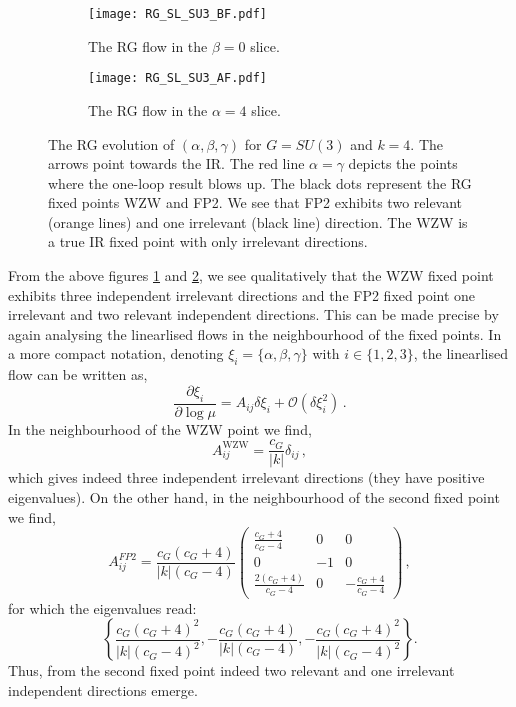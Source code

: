 \documentclass[12pt]{article}
\begin{document}
\begin{figure}[H]
	\centering
	\begin{subfigure}[t]{0.49\textwidth}
		\centering
		\texttt{[image: RG\_SL\_SU3\_BF.pdf]}
		\caption{ The RG flow in the $\beta=0$ slice. }\label{fig:RGslBF}		
	\end{subfigure}
	\begin{subfigure}[t]{0.49\textwidth}
		\centering
		\texttt{[image: RG\_SL\_SU3\_AF.pdf]}
		\caption{The RG flow in the $\alpha=4$ slice.}\label{fig:RGslAF}
	\end{subfigure}
	\caption{The RG evolution of $(\alpha,\beta,\gamma)$ for $G=SU(3)$ and $k=4$. The arrows point towards the IR. The red line $\alpha = \gamma$ depicts the points where the one-loop result blows up. The black dots represent the RG fixed points WZW and FP2. We see that FP2 exhibits two relevant (orange lines) and one irrelevant (black line) direction. The WZW is a true IR fixed point with only irrelevant directions. }\label{fig:RGsl}
\end{figure}



From the above figures \ref{fig:RGslBF} and \ref{fig:RGslAF}, we see qualitatively that the WZW fixed point exhibits three independent irrelevant directions and the FP2 fixed point one irrelevant and two relevant independent directions. This can be made precise by again analysing the linearlised flows in the neighbourhood of the fixed points. In a more compact notation, denoting $\xi_i = \{\alpha,\beta,\gamma\}$ with $i\in \{1,2,3\}$, the linearlised flow can be written as,
\begin{equation}
\frac{\partial \xi_{i}}{\partial\log\mu} = A_{ij}\delta\xi_{i} + \mathcal{O} (\delta\xi_{i}^{2})\,.
\end{equation}
In the neighbourhood of the WZW point we find,
\begin{equation}
A^{\text{WZW}}_{ij} =   \frac{c_G}{|k|}\delta_{ij}\,,
\end{equation}
which gives indeed three independent irrelevant directions (they have positive eigenvalues). On the other hand, in the neighbourhood of the second fixed point we find,
\begin{equation}
A^{FP2}_{ij} = \frac{c_G(c_G+4)}{|k|(c_G-4)}\begin{pmatrix}
\frac{c_G +4}{c_G - 4} &0&0\\
0&-1&0\\
\frac{2(c_G+4)}{c_G-4}&0&-\frac{c_G+4}{c_G-4}
\end{pmatrix}\,,
\end{equation}
for which the eigenvalues read:
\begin{equation}
 \left\{\frac{c_G(c_G +4)^{2}}{|k|(c_G-4)^{2}}, -\frac{c_G(c_G+4)}{|k|(c_G-4)}, -\frac{c_G(c_G+4)^{2}}{|k| (c_G-4)^{2}}   \right\}.
\end{equation}
Thus, from the second fixed point indeed two relevant and one irrelevant independent directions emerge.
\end{document}
